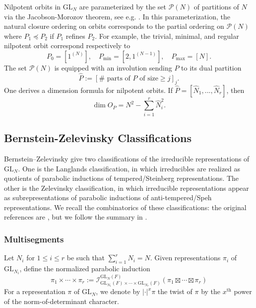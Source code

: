 \documentclass{amsart}
\newcommand{\mc}[1]{\mathcal{#1}}
\newcommand{\GL}{\mathrm{GL}}
\newcommand{\1}{\m 1}
\renewcommand{\th}{^{\text{th}}}
\theoremstyle{remark}
\theoremstyle{definition}
\numberwithin{equation}{subsection}
\begin{document}
Nilpotent orbits in $\GL_N$ are parameterized by the set $\mc P(N)$ of partitions of $N$ via the Jacobson-Morozov theorem, see e.g. \cite{CM93nilpotent}. %
In this parameterization, the natural closure ordering on orbits corresponds to the partial ordering on $\mc P(N)$ where $P_1 \preceq P_2$ if $P_1$ refines $P_2$. For example, the trivial, minimal, and regular nilpotent orbit correspond respectively to 
\[ 
P_{0}=[1^{(N)}], \quad P_{\mathrm{min}}=[2,1^{(N-1)}], \quad P_{\text{max}}=[N]. 
\] 
The set $\mc P(N)$ is equipped with an involution sending $P$ to its dual partition 
\begin{equation*} \label{eq: dual partition}
\hat{P} :=  [\#{\text{ parts of }P\text{  of size}\geq j}]_j. 
\end{equation*}
One derives a dimension formula for nilpotent orbits. If $\hat{P} = [\hat{N}_1,...,\hat{N}_r]$, then 
\begin{equation}\label{eq orbitdimension}
\dim O_P = N^2 - \sum_{i=1}^r \hat{N}^2_i.
\end{equation}

\subsection{Bernstein-Zelevinsky Classifications}
Bernstein--Zelevinsky give two classifications of the irreducible representations of $\GL_N$. One is the Langlands classification, in which irreducibles are realized as quotients of parabolic inductions of tempered/Steinberg representations. The other is the Zelevinsky classification, in which irreducible representations appear as subrepresentations of parabolic inductions of anti-tempered/Speh representations. 
We recall the combinatorics of these classifications: the original references are \cite{BZ77,Zel80}, but we follow the summary in \cite[\S2]{LM16}.


\subsubsection{Multisegments}
Let $N_i$ for $1 \leq i \leq r$ be such that $\sum_{i=1}^r N_i = N$. Given representations $\pi_i$ of $\GL_{N_i}$, define the normalized parabolic induction 
\[
\pi_1 \times \cdots \times \pi_r := \mc I_{\GL_{N_1}(F) \times \cdots \times \GL_{N_r}(F)}^{\GL_N(F)} (\pi_1 \boxtimes \cdots \boxtimes \pi_r)
\]
For a representation $\pi$ of $\GL_N$, we denote by $|\cdot|^x \pi$ the twist of $\pi$ by the $x\th$ power of the norm-of-determinant character. 
\end{document}
